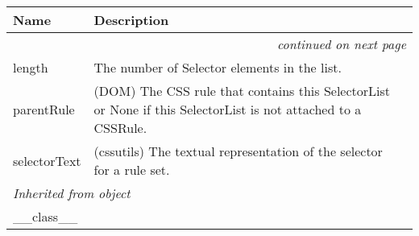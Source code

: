     \vspace{-1cm}
\hspace{\varindent}\begin{longtable}{|p{\varnamewidth}|p{\vardescrwidth}|l}
\cline{1-2}
\cline{1-2} \centering \textbf{Name} & \centering \textbf{Description}& \\
\cline{1-2}
\endhead\cline{1-2}\multicolumn{3}{r}{\small\textit{continued on next page}}\\\endfoot\cline{1-2}
\endlastfoot\raggedright l\-e\-n\-g\-t\-h\- & \raggedright The number of Selector elements in the list.&\\
\cline{1-2}
\raggedright p\-a\-r\-e\-n\-t\-R\-u\-l\-e\- & \raggedright (DOM) The CSS rule that contains this SelectorList or        None if this SelectorList is not attached to a CSSRule.&\\
\cline{1-2}
\raggedright s\-e\-l\-e\-c\-t\-o\-r\-T\-e\-x\-t\- & \raggedright (cssutils) The textual representation of the selector for
a rule set.&\\
\cline{1-2}
\multicolumn{2}{|l|}{\textit{Inherited from object}}\\
\multicolumn{2}{|p{\varwidth}|}{\raggedright \_\_class\_\_}\\
\cline{1-2}
\end{longtable}

